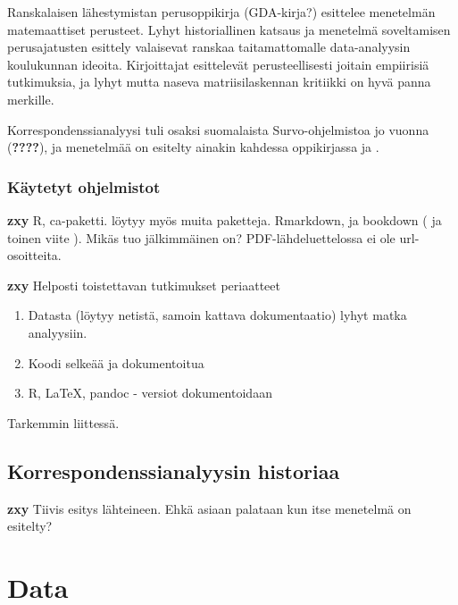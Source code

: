 \documentclass[
  finnish,
]{book}
\providecommand{\tightlist}{%
  \setlength{\itemsep}{0pt}\setlength{\parskip}{0pt}}
\begin{document}
Ranskalaisen lähestymistan perusoppikirja\citep{RefWorks:doc:5a857a43e4b0ed2d44664d75} (GDA-kirja?)
esittelee menetelmän matemaattiset perusteet.
Lyhyt historiallinen katsaus ja menetelmä soveltamisen perusajatusten esittely
valaisevat ranskaa taitamattomalle data-analyysin koulukunnan ideoita.
Kirjoittajat esittelevät perusteellisesti joitain empiirisiä tutkimuksia, ja
lyhyt mutta naseva matriisilaskennan kritiikki on hyvä panna merkille.

Korrespondenssianalyysi tuli osaksi suomalaista Survo-ohjelmistoa jo vuonna (\textbf{????}),
ja menetelmää on esitelty ainakin kahdessa oppikirjassa\citep{RefWorks:doc:5a857a44e4b0ed2d44664d95}
ja \citep{RefWorks:doc:5a857a44e4b0ed2d44664da4}.

\hypertarget{kuxe4ytetyt-ohjelmistot}{%
\subsection{Käytetyt ohjelmistot}\label{kuxe4ytetyt-ohjelmistot}}

\textbf{zxy} R, ca-paketti. löytyy myös muita paketteja.
Rmarkdown\citep{RefWorks:doc:5b6b346fe4b0c619b11b8a3e}, ja
bookdown (\citep{RefWorks:doc:5b6b36dde4b09b7ec442bf8b} ja toinen viite \citep{R-bookdown}).
Mikäs tuo jälkimmäinen on? PDF-lähdeluettelossa ei ole url-osoitteita.

\textbf{zxy} Helposti toistettavan tutkimukset periaatteet

\begin{enumerate}
\def\labelenumi{\arabic{enumi}.}
\tightlist
\item
  Datasta (löytyy netistä, samoin kattava dokumentaatio) lyhyt matka analyysiin.
\item
  Koodi selkeää ja dokumentoitua
\item
  R, LaTeX, pandoc - versiot dokumentoidaan
\end{enumerate}

Tarkemmin liittessä.

\hypertarget{korrespondenssianalyysin-historiaa}{%
\section{Korrespondenssianalyysin historiaa}\label{korrespondenssianalyysin-historiaa}}

\textbf{zxy} Tiivis esitys lähteineen. Ehkä asiaan palataan kun itse menetelmä on esitelty?

\hypertarget{data}{%
\chapter{Data}\label{data}}
\end{document}
